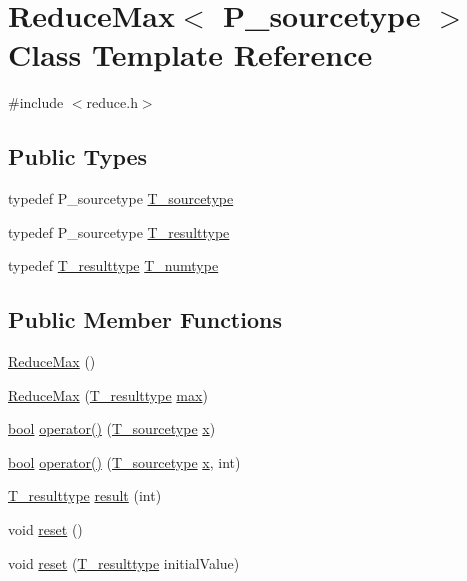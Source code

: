 \hypertarget{classReduceMax}{}\section{Reduce\+Max$<$ P\+\_\+sourcetype $>$ Class Template Reference}
\label{classReduceMax}


{\ttfamily \#include $<$reduce.\+h$>$}

\subsection*{Public Types}
\begin{DoxyCompactItemize}
\item 
typedef P\+\_\+sourcetype \hyperlink{classReduceMax_a814f56c97fb024a6ef81d22e9fd52b23}{T\+\_\+sourcetype}
\item 
typedef P\+\_\+sourcetype \hyperlink{classReduceMax_a5e86077304fc95a12800e10c2059f88a}{T\+\_\+resulttype}
\item 
typedef \hyperlink{classReduceMax_a5e86077304fc95a12800e10c2059f88a}{T\+\_\+resulttype} \hyperlink{classReduceMax_ae4efd4d75d2f9126d3191a2c96a43e96}{T\+\_\+numtype}
\end{DoxyCompactItemize}
\subsection*{Public Member Functions}
\begin{DoxyCompactItemize}
\item 
\hyperlink{classReduceMax_ab5f50c6b8414dd1db98760fd0c7f4f33}{Reduce\+Max} ()
\item 
\hyperlink{classReduceMax_a9e4df605af7b86c9cc5fbfe009d7b28d}{Reduce\+Max} (\hyperlink{classReduceMax_a5e86077304fc95a12800e10c2059f88a}{T\+\_\+resulttype} \hyperlink{vecbfn_8cc_a71f214d4a304fdc2089c54dbaf979fe5}{max})
\item 
\hyperlink{compiler_8h_abb452686968e48b67397da5f97445f5b}{bool} \hyperlink{classReduceMax_a678fb1046442d0cac05d49e0c1037d1e}{operator()} (\hyperlink{classReduceMax_a814f56c97fb024a6ef81d22e9fd52b23}{T\+\_\+sourcetype} \hyperlink{vecnorm1_8cc_ac73eed9e41ec09d58f112f06c2d6cb63}{x})
\item 
\hyperlink{compiler_8h_abb452686968e48b67397da5f97445f5b}{bool} \hyperlink{classReduceMax_ac135b9700dec9bb74db775c83e904ff0}{operator()} (\hyperlink{classReduceMax_a814f56c97fb024a6ef81d22e9fd52b23}{T\+\_\+sourcetype} \hyperlink{vecnorm1_8cc_ac73eed9e41ec09d58f112f06c2d6cb63}{x}, int)
\item 
\hyperlink{classReduceMax_a5e86077304fc95a12800e10c2059f88a}{T\+\_\+resulttype} \hyperlink{classReduceMax_adab6e052e48c673b7bb31535cd45721c}{result} (int)
\item 
void \hyperlink{classReduceMax_a91972d7ac5f8e40a41a4cb5c0ebfcb4b}{reset} ()
\item 
void \hyperlink{classReduceMax_a63ff12d2b5e15920d2edb66e109a4630}{reset} (\hyperlink{classReduceMax_a5e86077304fc95a12800e10c2059f88a}{T\+\_\+resulttype} initial\+Value)
\end{DoxyCompactItemize}
